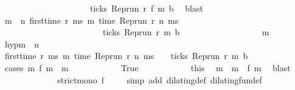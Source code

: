 \begin{isabellebody}
\ \ \ \ \ \ \ \ \ \ \ \ \ \ \ \ \ \ \ \ {\isasymlongrightarrow}\ ticks\ {\isacharparenleft}{\isacharparenleft}Rep{\isacharunderscore}run\ r{\isacharparenright}\ {\isacharparenleft}f\ m\ b{\isacharparenright}{\isacharparenright}{\isacartoucheclose}\ \isamarkupfalse%
\ blast\isanewline
\ \ \ \ \ \ \isamarkupfalse%
\ {\isacartoucheopen}{\isacharparenleft}{\isasymforall}m\ {\isasymge}\ n{\isachardot}\ first{\isacharunderscore}time\ r\ ms\ m\ {\isacharparenleft}time\ {\isacharparenleft}{\isacharparenleft}Rep{\isacharunderscore}run\ r{\isacharparenright}\ n\ ms{\isacharparenright}\ {\isacharplus}\ {\isasymdelta}{\isasymtau}{\isacharparenright}\ \isanewline
\ \ \ \ \ \ \ \ \ \ \ \ \ \ \ \ \ \ \ \ \ \ \ {\isasymlongrightarrow}\ ticks\ {\isacharparenleft}{\isacharparenleft}Rep{\isacharunderscore}run\ r{\isacharparenright}\ m\ b{\isacharparenright}{\isacharparenright}\ {\isacartoucheclose}\isanewline
\ \ \ \ \ \ \isamarkupfalse%
\ {\isacharminus}\isanewline
\ \ \ \ \ \ \isacommand{{\isacharbraceleft}}\isamarkupfalse%
\ \isamarkupfalse%
\ m\ \isamarkupfalse%
\ hyp{\isacharcolon}{\isacartoucheopen}m\ {\isasymge}\ n{\isacartoucheclose}\isanewline
\ \ \ \ \ \ \ \ \isamarkupfalse%
\ {\isacartoucheopen}first{\isacharunderscore}time\ r\ ms\ m\ {\isacharparenleft}time\ {\isacharparenleft}Rep{\isacharunderscore}run\ r\ n\ ms{\isacharparenright}\ {\isacharplus}\ {\isasymdelta}{\isasymtau}{\isacharparenright}\ {\isasymlongrightarrow}\ ticks\ {\isacharparenleft}Rep{\isacharunderscore}run\ r\ m\ b{\isacharparenright}{\isacartoucheclose}\isanewline
\ \ \ \ \ \ \ \ \isamarkupfalse%
\ {\isacharparenleft}cases\ {\isacartoucheopen}{\isasymexists}m\ f\ m\ {\isacharequal}\ m{\isacartoucheclose}{\isacharparenright}\isanewline
\ \ \ \ \ \ \ \ \ \ \isamarkupfalse%
\ True\isanewline
\ \ \ \ \ \ \ \ \ \ \isamarkupfalse%
\ this\ \isamarkupfalse%
\ m\ \ {\isacartoucheopen}m\ {\isacharequal}\ f\ m\ \isamarkupfalse%
\ blast\isanewline
\ \ \ \ \ \ \ \ \ \ \isamarkupfalse%
\ \isamarkupfalse%
\ {\isacartoucheopen}strict{\isacharunderscore}mono\ f{\isacartoucheclose}\ \isamarkupfalse%
\ {\isacharasterisk}\ \isamarkupfalse%
\ {\isacharparenleft}simp\ add{\isacharcolon}\ dilating{\isacharunderscore}def\ dilating{\isacharunderscore}fun{\isacharunderscore}def{\isacharparenright}\isanewline

\end{isabellebody}
